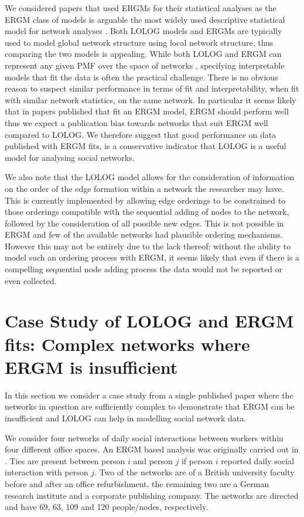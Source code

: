 \documentclass[
]{statsoc}
\begin{document}
We considered papers that used ERGMs for their statistical analyses as
the ERGM class of models is arguable the most widely used descriptive
statistical model for network analyses \citep{Amati2018}. Both LOLOG
models and ERGMs are typically used to model global network structure
using local network structure, thus comparing the two models is
appealing. While both LOLOG and ERGM can represent any given PMF over
the space of networks \citep{Fellows2018}, specifying interpretable
models that fit the data is often the practical challenge. There is no
obvious reason to suspect similar performance in terms of fit and
interpretability, when fit with similar network statistics, on the same
network. In particular it seems likely that in papers published that fit
an ERGM model, ERGM should perform well thus we expect a publication
bias towards networks that suit ERGM well compared to LOLOG. We
therefore suggest that good performance on data published with ERGM
fits, is a conservative indicator that LOLOG is a useful model for
analysing social networks.

We also note that the LOLOG model allows for the consideration of
information on the order of the edge formation within a network the
researcher may have. This is currently implemented by allowing edge
orderings to be constrained to those orderings compatible with the
sequential adding of nodes to the network, followed by the consideration
of all possible new edges. This is not possible in ERGM and few of the
available networks had plausible ordering mechanisms. However this may
not be entirely due to the lack thereof: without the ability to model
such an ordering process with ERGM, it seems likely that even if there
is a compelling sequential node adding process the data would not be
reported or even collected.

\section{Case Study of LOLOG and ERGM fits: Complex networks where ERGM is insufficient}\label{sec:offices}

In this section we consider a case study from a single published paper
where the networks in question are sufficiently complex to demonstrate
that ERGM can be insufficient and LOLOG can help in modelling social
network data.

We consider four networks of daily social interactions between workers
within four different office spaces. An ERGM based analysis was
originally carried out in \cite{Sailer2012}. Ties are present between
person \(i\) and person \(j\) if person \(i\) reported daily social
interaction with person \(j\). Two of the networks are of a British
university faculty before and after an office refurbishment, the
remaining two are a German research institute and a corporate publishing
company. The networks are directed and have 69, 63, 109 and 120
people/nodes, respectively.
\end{document}
